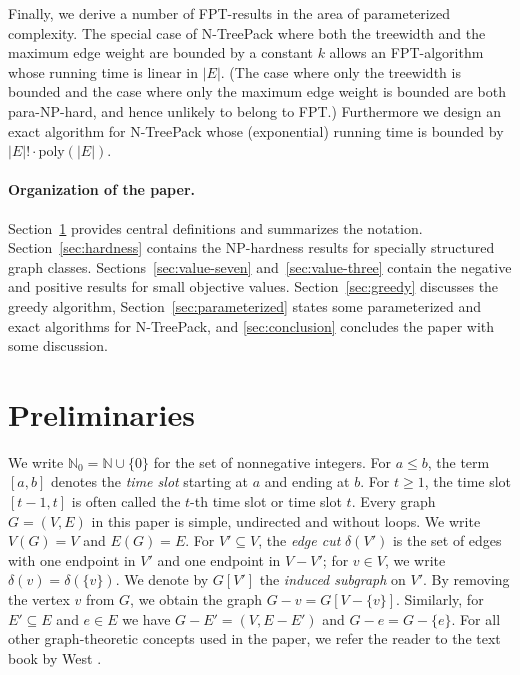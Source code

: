 \documentclass[runningheads]{llncs}
\newcommand{\NN}{\mathbb{N}}
\newcommand{\set}[1]{\{ #1 \}}
\newcommand{\xxxNTP}{{\sc N-TreePack}}
\begin{document}
Finally, we derive a number of FPT-results in the area of parameterized complexity.
The special case of {\xxxNTP} where both the treewidth and the maximum edge weight are 
bounded by a constant $k$ allows an FPT-algorithm whose running time is linear in $|E|$.
(The case where only the treewidth is bounded and the case where only the maximum 
edge weight is bounded are both para-NP-hard, and hence unlikely to belong to FPT.)
Furthermore we design an exact algorithm for {\xxxNTP} whose (exponential) 
running time is bounded by $|E|!\cdot\text{poly}(|E|)$.

\paragraph{Organization of the paper.}
Section~\ref{sec:notation} provides central definitions and summarizes the notation.
Section~\ref{sec:hardness} contains the NP-hardness results for specially structured graph classes. 
Sections~\ref{sec:value-seven} and~\ref{sec:value-three} contain the negative and positive results 
for small objective values. 
Section~\ref{sec:greedy} discusses the greedy algorithm, 
Section~\ref{sec:parameterized} states some parameterized and exact algorithms for {\xxxNTP}, and
\cref{sec:conclusion} concludes the paper with some discussion.


\section{Preliminaries}
\label{sec:notation}
We write $\NN_0= \NN \cup \set{0}$ for the set of nonnegative integers. 
For $a\le b$, the term $[a,b]$ denotes the \emph{time slot} starting at $a$ and ending at $b$. 
For $t\ge1$, the time slot $[t-1,t]$ is often called the $t$-th time slot or time slot $t$.
Every graph $G=(V,E)$ in this paper is simple, undirected and without loops. We write $V(G) = V$ and $E(G) = E$.
For $V'\subseteq V$, the \emph{edge cut} $\delta(V')$ is the set of edges with one endpoint 
in $V'$ and one endpoint in $V-V'$; for $v\in V$, we write $\delta(v) = \delta(\set{v})$.
We denote by $G[V']$ the \emph{induced subgraph} on $V'$.
By removing the vertex $v$ from $G$, we obtain the graph $G-v=G[V-\set{v}]$.
Similarly, for $E'\subseteq E$ and $e\in E$ we have $G-E'=(V,E-E')$ and $G-e=G-\set{e}$.
For all other graph-theoretic concepts used in the paper, we refer the reader to the
text book by West \cite{WestBook}.
\end{document}
